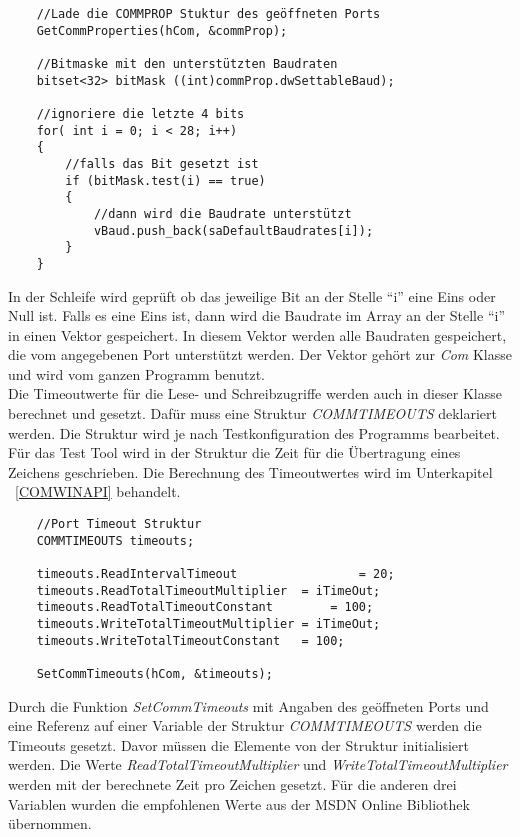 \begin{lstlisting}
	//Lade die COMMPROP Stuktur des geöffneten Ports	 
	GetCommProperties(hCom, &commProp);
 
 	//Bitmaske mit den unterstützten Baudraten
	bitset<32> bitMask ((int)commProp.dwSettableBaud);
	
	//ignoriere die letzte 4 bits
	for( int i = 0; i < 28; i++)
	{
		//falls das Bit gesetzt ist
		if (bitMask.test(i) == true)
		{
			//dann wird die Baudrate unterstützt
			vBaud.push_back(saDefaultBaudrates[i]);
		}
	}
\end{lstlisting}

In der Schleife wird geprüft ob das jeweilige Bit an der Stelle "`i"' eine Eins oder Null ist. Falls es eine Eins ist, dann wird die Baudrate im Array an der Stelle "`i"' in einen Vektor gespeichert. In diesem Vektor werden alle Baudraten gespeichert, die vom angegebenen Port unterstützt werden. Der Vektor gehört zur \textit{Com} Klasse und wird vom ganzen Programm benutzt.\\

Die Timeoutwerte für die Lese- und Schreibzugriffe werden auch in dieser Klasse berechnet und gesetzt. Dafür muss eine  Struktur \textit{COMMTIMEOUTS} deklariert werden. Die Struktur wird je nach Testkonfiguration des Programms bearbeitet. Für das Test Tool wird in der Struktur die Zeit für die Übertragung eines Zeichens geschrieben. Die Berechnung des Timeoutwertes wird im Unterkapitel ~\ref{COMWINAPI} behandelt.

\begin{lstlisting}
	//Port Timeout Struktur
	COMMTIMEOUTS timeouts;
	
	timeouts.ReadIntervalTimeout				 = 20;
	timeouts.ReadTotalTimeoutMultiplier	 = iTimeOut;
	timeouts.ReadTotalTimeoutConstant		 = 100;
	timeouts.WriteTotalTimeoutMultiplier = iTimeOut;
	timeouts.WriteTotalTimeoutConstant	 = 100;
	
	SetCommTimeouts(hCom, &timeouts);
\end{lstlisting}

Durch die Funktion \textit{SetCommTimeouts} mit Angaben des geöffneten Ports und eine Referenz auf einer Variable der Struktur \textit{COMMTIMEOUTS} werden die Timeouts gesetzt. Davor müssen die Elemente von der Struktur initialisiert werden. Die Werte \textit{ReadTotalTimeoutMultiplier} und \textit{WriteTotalTimeoutMultiplier} werden mit der berechnete Zeit pro Zeichen gesetzt. Für die anderen drei Variablen wurden die empfohlenen Werte aus der MSDN Online Bibliothek\cite{SerialCommunications} übernommen. \\

